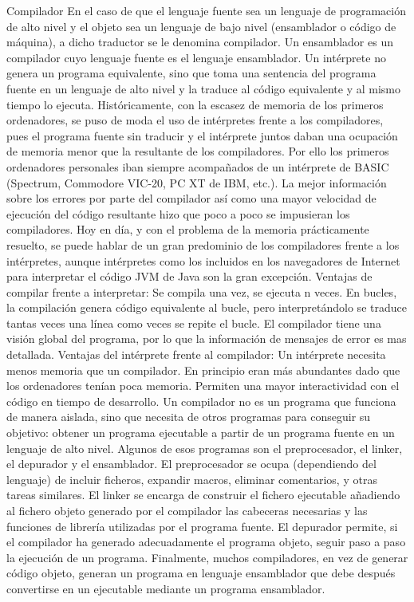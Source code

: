 Compilador
En el caso de que el lenguaje fuente sea un lenguaje de programación de alto nivel y el objeto sea un lenguaje de bajo nivel (ensamblador o código de máquina), a dicho traductor se le denomina compilador. Un ensamblador es un compilador cuyo lenguaje fuente es el lenguaje ensamblador. Un intérprete no genera un programa equivalente, sino que toma una sentencia del programa fuente en un lenguaje de alto nivel y la traduce al código equivalente y al mismo tiempo lo ejecuta. Históricamente, con la escasez de memoria de los primeros ordenadores, se puso de moda el uso de intérpretes frente a los compiladores, pues el programa fuente sin traducir y el intérprete juntos daban una ocupación de memoria menor que la resultante de los compiladores. Por ello los primeros ordenadores personales iban siempre acompañados de un intérprete de BASIC (Spectrum, Commodore VIC-20, PC XT de IBM, etc.). La mejor información sobre los errores por parte del compilador así como una mayor velocidad de ejecución del código resultante hizo que poco a poco se impusieran los compiladores. Hoy en día, y con el problema de la memoria prácticamente resuelto, se puede hablar de un gran predominio de los compiladores frente a los intérpretes, aunque intérpretes como los incluidos en los navegadores de Internet para interpretar el código JVM de Java son la gran excepción.
Ventajas de compilar frente a interpretar:
Se compila una vez, se ejecuta n veces.
En bucles, la compilación genera código equivalente al bucle, pero interpretándolo se traduce tantas veces una línea como veces se repite el bucle.
El compilador tiene una visión global del programa, por lo que la información de mensajes de error es mas detallada.
Ventajas del intérprete frente al compilador:
Un intérprete necesita menos memoria que un compilador. En principio eran más abundantes dado que los ordenadores tenían poca memoria.
Permiten una mayor interactividad con el código en tiempo de desarrollo.
Un compilador no es un programa que funciona de manera aislada, sino que necesita de otros programas para conseguir su objetivo: obtener un programa ejecutable a partir de un programa fuente en un lenguaje de alto nivel. Algunos de esos programas son el preprocesador, el linker, el depurador y el ensamblador. El preprocesador se ocupa (dependiendo del lenguaje) de incluir ficheros, expandir macros, eliminar comentarios, y otras tareas similares. El linker se encarga de construir el fichero ejecutable añadiendo al fichero objeto generado por el compilador las cabeceras necesarias y las funciones de librería utilizadas por el programa fuente. El depurador permite, si el compilador ha generado adecuadamente el programa objeto, seguir paso a paso la ejecución de un programa. Finalmente, muchos compiladores, en vez de generar código objeto, generan un programa en lenguaje ensamblador que debe después convertirse en un ejecutable mediante un programa ensamblador.

